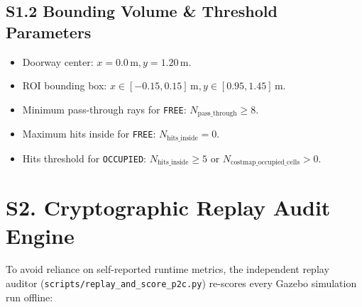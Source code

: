\documentclass[10pt]{article}
\begin{document}
\subsection{S1.2 Bounding Volume \& Threshold Parameters}
\begin{itemize}
    \item Doorway center: $x = 0.0\,\text{m}, y = 1.20\,\text{m}$.
    \item ROI bounding box: $x \in [-0.15, 0.15]\,\text{m}, y \in [0.95, 1.45]\,\text{m}$.
    \item Minimum pass-through rays for \texttt{FREE}: $N_{\text{pass\_through}} \ge 8$.
    \item Maximum hits inside for \texttt{FREE}: $N_{\text{hits\_inside}} = 0$.
    \item Hits threshold for \texttt{OCCUPIED}: $N_{\text{hits\_inside}} \ge 5$ or $N_{\text{costmap\_occupied\_cells}} > 0$.
\end{itemize}

\section{S2. Cryptographic Replay Audit Engine}
To avoid reliance on self-reported runtime metrics, the independent replay auditor (\nolinkurl{scripts/replay_and_score_p2c.py}) re-scores every Gazebo simulation run offline:
\end{document}
